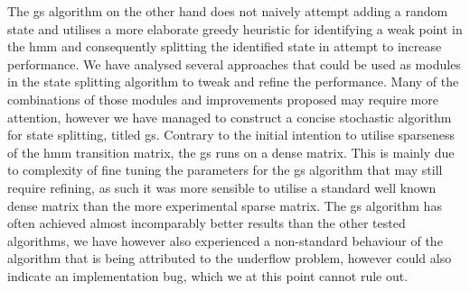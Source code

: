 The \acrlong{gs} algorithm on the other hand does not naively attempt adding a random state and utilises a more elaborate greedy heuristic for identifying a weak point in the \gls{hmm} and consequently splitting the identified state in attempt to increase performance. We have analysed several approaches that could be used as modules in the state splitting algorithm to tweak and refine the performance. Many of the combinations of those modules and improvements proposed may require more attention, however we have managed to construct a concise stochastic algorithm for state splitting, titled \acrlong{gs}. Contrary to the initial intention to utilise sparseness of the \gls{hmm} transition matrix, the \gls{gs} runs on a dense matrix. This is mainly due to complexity of fine tuning the parameters for the \gls{gs} algorithm that may still require refining, as such it was more sensible to utilise a standard well known dense matrix than the more experimental sparse matrix. The \gls{gs} algorithm has often achieved almost incomparably better results than the other tested algorithms, we have however also experienced a non-standard behaviour of the algorithm that is being attributed to the underflow problem, however could also indicate an implementation bug, which we at this point cannot rule out.



